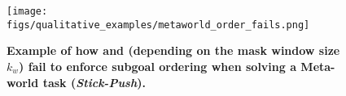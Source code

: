 \begin{figure}
    \centering
    \texttt{[image: figs/qualitative\_examples/metaworld\_order\_fails.png]}
    \caption{\small \textbf{Example of how \ot{} and \tot{} (depending on the mask window size $k_w$) fail to enforce subgoal ordering when solving a Meta-world task (\textit{Stick-Push}).} }
    \label{fig:meta_order_fail}
\end{figure}
